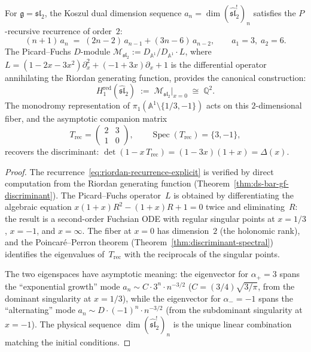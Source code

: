 \begin{proposition}
\label{prop:hred-sl2}
For $\mathfrak{g} = \mathfrak{sl}_2$, the Koszul dual dimension
sequence $a_n = \dim(\widehat{\mathfrak{sl}}_2^!)_n$ satisfies
the $P$-recursive recurrence of order~$2$:
\begin{equation}\label{eq:riordan-recurrence-explicit}
(n+1)\, a_n \;=\; (2n-2)\, a_{n-1} + (3n-6)\, a_{n-2},
\qquad a_1 = 3,\; a_2 = 6.
\end{equation}
The Picard--Fuchs $D$-module
$\mathcal{M}_{\mathfrak{sl}_2}
:= D_{\mathbb{A}^1} / D_{\mathbb{A}^1} \cdot L$,
where $L = (1 - 2x - 3x^2)\partial_x^2
+ (-1 + 3x)\partial_x + 1$
is the differential operator annihilating the Riordan
generating function, provides the canonical construction:
\[
H^{\mathrm{red}}_1(\widehat{\mathfrak{sl}}_2)
\;:=\; \mathcal{M}_{\mathfrak{sl}_2}\big|_{x=0}
\;\cong\; \mathbb{Q}^2.
\]
The monodromy representation of
$\pi_1(\mathbb{A}^1 \setminus \{1/3, -1\})$ acts on this
$2$-dimensional fiber, and the asymptotic companion matrix
\[
T_{\mathrm{rec}} =
\begin{pmatrix} 2 & 3 \\ 1 & 0 \end{pmatrix},
\qquad
\operatorname{Spec}(T_{\mathrm{rec}}) = \{3, -1\},
\]
recovers the discriminant:
$\det(1 - x\, T_{\mathrm{rec}}) = (1-3x)(1+x) = \Delta(x)$.
\end{proposition}

\begin{proof}
The recurrence~\eqref{eq:riordan-recurrence-explicit} is
verified by direct computation from the Riordan generating
function (Theorem~\ref{thm:ds-bar-gf-discriminant}).
The Picard--Fuchs operator~$L$ is obtained by differentiating
the algebraic equation
$x(1{+}x)R^2 - (1{+}x)R + 1 = 0$
twice and eliminating~$R$: the result is a second-order Fuchsian
ODE with regular singular points at $x = 1/3$, $x = -1$, and
$x = \infty$.  The fiber at $x = 0$ has dimension~$2$ (the
holonomic rank), and the
Poincar\'e--Perron theorem
(Theorem~\ref{thm:discriminant-spectral})
identifies the eigenvalues of~$T_{\mathrm{rec}}$ with the
reciprocals of the singular points.

The two eigenspaces have asymptotic meaning:
the eigenvector for $\alpha_+ = 3$ spans the ``exponential
growth'' mode $a_n \sim C \cdot 3^n \cdot n^{-3/2}$
($C = (3/4)\sqrt{3/\pi}$, from the dominant singularity at
$x = 1/3$), while the eigenvector for $\alpha_- = -1$ spans
the ``alternating'' mode $a_n \sim D \cdot (-1)^n \cdot n^{-3/2}$
(from the subdominant singularity at $x = -1$).  The physical
sequence $\dim(\widehat{\mathfrak{sl}}_2^!)_n$ is the unique
linear combination matching the initial conditions.
\end{proof}

